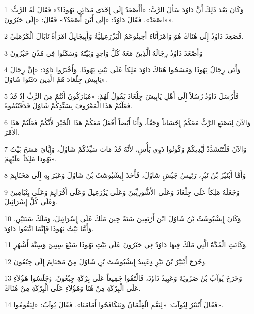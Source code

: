 \par 1 وَكَانَ بَعْدَ ذَلِكَ أَنَّ دَاوُدَ سَأَلَ الرَّبَّ: «أَأَصْعَدُ إِلَى إِحْدَى مَدَائِنِ يَهُوذَا؟» فَقَالَ لَهُ الرَّبُّ: «اصْعَدْ». فَقَالَ دَاوُدُ: «إِلَى أَيْنَ أَصْعَدُ؟» فَقَالَ: «إِلَى حَبْرُونَ».
\par 2 فَصَعِدَ دَاوُدُ إِلَى هُنَاكَ هُوَ وَامْرَأَتَاهُ أَخِينُوعَمُ الْيَزْرَعِيلِيَّةُ وَأَبِيجَايِلُ امْرَأَةُ نَابَالَ الْكَرْمَلِيِّ.
\par 3 وَأَصْعَدَ دَاوُدُ رِجَالَهُ الَّذِينَ مَعَهُ كُلَّ وَاحِدٍ وَبَيْتَهُ وَسَكَنُوا فِي مُدُنِ حَبْرُونَ.
\par 4 وَأَتَى رِجَالُ يَهُوذَا وَمَسَحُوا هُنَاكَ دَاوُدَ مَلِكاً عَلَى بَيْتِ يَهُوذَا. وَأَخْبَرُوا دَاوُدَ: «إِنَّ رِجَالَ يَابِيشَ جِلْعَادَ هُمُ الَّذِينَ دَفَنُوا شَاوُلَ».
\par 5 فَأَرْسَلَ دَاوُدُ رُسُلاً إِلَى أَهْلِ يَابِيشَ جِلْعَادَ يَقُولُ لَهُمْ: «مُبَارَكُونَ أَنْتُمْ مِنَ الرَّبِّ إِذْ قَدْ فَعَلْتُمْ هَذَا الْمَعْرُوفَ بِسَيِّدِكُمْ شَاوُلَ فَدَفَنْتُمُوهُ.
\par 6 وَالآنَ لِيَصْنَعِ الرَّبُّ مَعَكُمْ إِحْسَاناً وَحَقّاً، وَأَنَا أَيْضاً أَفْعَلُ مَعَكُمْ هَذَا الْخَيْرَ لأَنَّكُمْ فَعَلْتُمْ هَذَا الأَمْرَ.
\par 7 وَالآنَ فَلْتَتَشَدَّدْ أَيْدِيكُمْ وَكُونُوا ذَوِي بَأْسٍ، لأَنَّهُ قَدْ مَاتَ سَيِّدُكُمْ شَاوُلُ، وَإِيَّايَ مَسَحَ بَيْتُ يَهُوذَا مَلِكاً عَلَيْهِمْ».
\par 8 وَأَمَّا أَبْنَيْرُ بْنُ نَيْرٍ، رَئِيسُ جَيْشِ شَاوُلَ، فَأَخَذَ إِيشْبُوشَثَ بْنَ شَاوُلَ وَعَبَرَ بِهِ إِلَى مَحَنَايِمَ
\par 9 وَجَعَلَهُ مَلِكاً عَلَى جِلْعَادَ وَعَلَى الأَشُّورِيِّينَ وَعَلَى يَزْرَعِيلَ وَعَلَى أَفْرَايِمَ وَعَلَى بِنْيَامِينَ وَعَلَى كُلِّ إِسْرَائِيلَ.
\par 10 وَكَانَ إِيشْبُوشَثُ بْنُ شَاوُلَ ابْنَ أَرْبَعِينَ سَنَةً حِينَ مَلَكَ عَلَى إِسْرَائِيلَ، وَمَلَكَ سَنَتَيْنِ. وَأَمَّا بَيْتُ يَهُوذَا فَإِنَّمَا اتَّبَعُوا دَاوُدَ.
\par 11 وَكَانَتِ الْمُدَّةُ الَّتِي مَلَكَ فِيهَا دَاوُدُ فِي حَبْرُونَ عَلَى بَيْتِ يَهُوذَا سَبْعَ سِنِينَ وَسِتَّةَ أَشْهُرٍ.
\par 12 وَخَرَجَ أَبْنَيْرُ بْنُ نَيْرٍ وَعَبِيدُ إِيشْبُوشَثَ بْنِ شَاوُلَ مِنْ مَحَنَايِمَ إِلَى جِبْعُونَ.
\par 13 وَخَرَجَ يُوآبُ بْنُ صَرُويَةَ وَعَبِيدُ دَاوُدَ، فَالْتَقُوا جَمِيعاً عَلَى بِرْكَةِ جِبْعُونَ. وَجَلَسُوا هَؤُلاَءِ عَلَى الْبِرْكَةِ مِنْ هُنَا وَهَؤُلاَءِ عَلَى الْبِرْكَةِ مِنْ هُنَاكَ.
\par 14 فَقَالَ أَبْنَيْرُ لِيُوآبَ: «لِيَقُمِ الْغِلْمَانُ وَيَتَكَافَحُوا أَمَامَنَا». فَقَالَ يُوآبُ: «لِيَقُومُوا».

